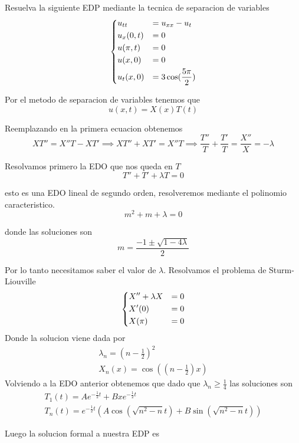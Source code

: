 \message{ !name(MAT024.tex)}\documentclass[../main.tex]{subfiles}
\begin{document}
\begin{problem}
  Resuelva la siguiente EDP mediante la tecnica de separacion de variables
  \begin{equation*}
  \begin{dcases}
    u_{tt} &= u_{xx} - u_t\\
    u_x(0, t) &= 0\\
    u(\pi, t) &= 0\\
    u(x, 0) &= 0\\
    u_t(x, 0) &= 3 \cos(\frac{5\pi}{2})
  \end{dcases}
  \end{equation*}
\end{problem}
\begin{solution}
  Por el metodo de separacion de variables tenemos que
  \begin{equation*}
    u(x, t) = X(x)T(t)
  \end{equation*}

  Reemplazando en la primera ecuacion obtenemos
  \begin{equation*}
    XT'' = X''T - XT' \implies XT'' + XT' = X''T \implies \frac{T''}{T} + \frac{T'}{T} = \frac{X''}{X} = -\lambda
  \end{equation*}

  Resolvamos primero la EDO que nos queda en $T$
  \begin{equation*}
    T'' + T' + \lambda T = 0
  \end{equation*}

  esto es una EDO lineal de segundo orden, resolveremos mediante el polinomio caracteristico.
  \begin{equation*}
    m^{2} + m + \lambda = 0
  \end{equation*}

  donde las soluciones son
  \begin{equation*}
    m = \frac{-1 \pm \sqrt{1 - 4\lambda}}{2}
  \end{equation*}

  Por lo tanto necesitamos saber el valor de $\lambda$. Resolvamos el problema de Sturm-Liouville
  \begin{equation*}
    \begin{dcases}
      X'' + \lambda X &= 0\\
      X'(0) &= 0\\
      X(\pi) &= 0
    \end{dcases}
  \end{equation*}
  Donde la solucion viene dada por
  \begin{gather*}
    \lambda_{n} = (n - \frac12)^{2}\\
    X_{n}(x) = \cos((n - \frac12)x)
  \end{gather*}
  Volviendo a la EDO anterior obtenemos que dado que $\lambda_{n} \geq \frac{1}{4}$ las soluciones son
  \begin{gather*}
    T_{1}(t) = Ae^{-\frac12 t} + Bxe^{-\frac12 t}\\
    T_{n}(t) = e^{-\frac12 t}(A \cos(\sqrt{n^{2} - n} t) + B \sin(\sqrt{n^{2} - n}t))
  \end{gather*}

  Luego la solucion formal a nuestra EDP es
\end{solution}
\end{document}
